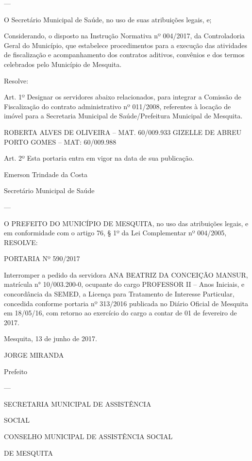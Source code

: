 \documentclass{doliberto}
\begin{document}
---

O  Secretário  Municipal  de  Saúde,  no  uso  de  suas 
atribuições legais, e; 
 
        
Considerando, o disposto na Instrução Normativa 
nº  004/2017,  da  Controladoria  Geral  do  Município,  que 
estabelece procedimentos para a execução das atividades de 
fiscalização  e  acompanhamento  dos  contratos  aditivos, 
convênios  e  dos  termos  celebrados  pelo  Município  de 
Mesquita.  
 
Resolve:  
 
Art.  1º  Designar  os  servidores  abaixo  relacionados,  para 
integrar  a  Comissão  de  Fiscalização  do  contrato 
administrativo nº 011/2008, referentes à locação de imóvel 
para a Secretaria Municipal de Saúde/Prefeitura Municipal 
de Mesquita. 
 
ROBERTA ALVES DE OLIVEIRA – MAT. 60/009.933 
GIZELLE DE ABREU PORTO GOMES – MAT: 60/009.988 
 
 
Art.  2º  Esta  portaria  entra  em  vigor  na  data  de  sua 
publicação. 
 
 

Emerson Trindade da Costa 

Secretário Municipal de Saúde 

---

O  PREFEITO  DO  MUNICÍPIO  DE  MESQUITA,  no  uso  das 
atribuições legais, e em conformidade com o artigo 76, § 1º 
da Lei Complementar nº 004/2005, 
  RESOLVE:  
 
PORTARIA Nº 590/2017 
 
Interromper  a  pedido  da  servidora  ANA  BEATRIZ  DA 
CONCEIÇÃO  MANSUR,  matrícula  n°  10/003.200-0, 
ocupante  do  cargo      PROFESSOR  II  –  Anos  Iniciais,  e 
concordância da SEMED, a Licença para Tratamento de 
Interesse  Particular,  concedida  conforme  portaria  nº 
313/2016  publicada  no  Diário  Oficial  de  Mesquita  em 
18/05/16, com retorno ao exercício do cargo a contar de  01 
de fevereiro de 2017. 
 

Mesquita, 13 de junho de 2017. 

 

JORGE MIRANDA 

Prefeito 

---

SECRETARIA MUNICIPAL DE ASSISTÊNCIA 

SOCIAL 

CONSELHO MUNICIPAL DE ASSISTÊNCIA SOCIAL 

DE MESQUITA 
\end{document}
